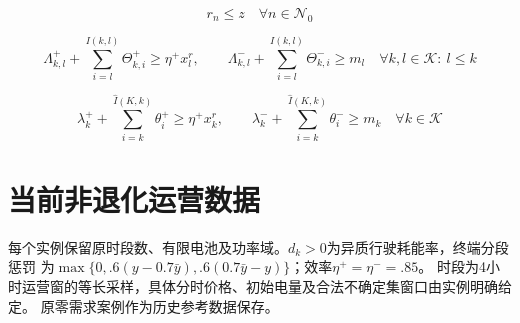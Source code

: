 \documentclass[11pt]{ctexart}
\begin{document}
\begin{equation}
r_n \le z
\quad \forall n \in \mathcal N_0
\tag{33}
\end{equation}

\begin{equation}
\Lambda_{k,l}^+ + \sum_{i=l}^{I(k,l)} \Theta_{k,i}^+ \ge \eta^+ x_l^r,\qquad
\Lambda_{k,l}^- + \sum_{i=l}^{I(k,l)} \Theta_{k,i}^- \ge m_l
\quad \forall k,l \in \mathcal K:\ l \le k
\tag{34}
\end{equation}

\begin{equation}
\lambda_k^+ + \sum_{i=k}^{\hat I(K,k)} \theta_i^+ \ge \eta^+ x_k^r,\qquad
\lambda_k^- + \sum_{i=k}^{\hat I(K,k)} \theta_i^- \ge m_k
\quad \forall k \in \mathcal K
\tag{35}
\end{equation}


\section*{当前非退化运营数据}
每个实例保留原时段数、有限电池及功率域。$d_k>0$为异质行驶耗能率，终端分段惩罚
为$\max\{0,.6(y-0.7\bar y),.6(0.7\bar y-y)\}$；效率$\eta^+=\eta^-=.85$。
时段为4小时运营窗的等长采样，具体分时价格、初始电量及合法不确定集窗口由实例明确给定。
原零需求案例作为历史参考数据保存。
\end{document}
